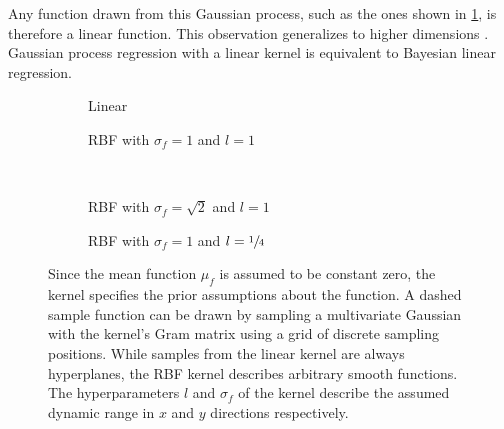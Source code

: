 Any function drawn from this Gaussian process, such as the ones shown in \cref{fig:gp_samples:linear}, is therefore a linear function.
This observation generalizes to higher dimensions \cite{rasmussen_gaussian_2006}.
Gaussian process regression with a linear kernel is equivalent to Bayesian linear regression.
\begin{figure}[p]
    \begin{subfigure}[b]{\halffigurewidth}
        \centering
        \caption{
            Linear
            \label{fig:gp_samples:linear}
        }
    \end{subfigure}
    \hfill
    \begin{subfigure}[b]{\halffigurewidth}
        \centering
        \caption{
            RBF with $\sigma_f = 1$ and $l=1$
            \label{fig:gp_samples:rbf_normal}
        }
    \end{subfigure}\\[4ex]
    \begin{subfigure}[b]{\halffigurewidth}
        \centering
        \caption{
            RBF with $\sigma_f = \sqrt{2}$ and $l=1$
            \label{fig:gp_samples:rbf_noisy}
        }
    \end{subfigure}
    \hfill
    \begin{subfigure}[b]{\halffigurewidth}
        \centering
        \caption{
            RBF with $\sigma_f = 1$ and $l=\sfrac{1}{4}$
            \label{fig:gp_samples:rbf_lengthscale}
        }
    \end{subfigure}
    \caption[Samples from GP priors]{
        Since the mean function $\mu_f$ is assumed to be constant zero, the kernel specifies the prior assumptions about the function.
        A dashed sample function can be drawn by sampling a multivariate Gaussian with the kernel's Gram matrix using a grid of discrete sampling positions.
        While samples from the linear kernel are always hyperplanes, the RBF kernel describes arbitrary smooth functions.
        The hyperparameters $l$ and $\sigma_f$ of the kernel describe the assumed dynamic range in $x$ and $y$ directions respectively.
        \label{fig:gp_samples}
    }
\end{figure}

